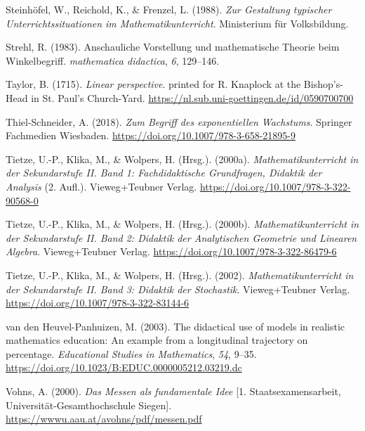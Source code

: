 \documentclass[
]{scrbook}
\newlength{\cslhangindent}
\newenvironment{CSLReferences}[2] %
 {\begin{list}{}{%
  \setlength{\itemindent}{0pt}
  \setlength{\leftmargin}{0pt}
  \setlength{\parsep}{0pt}
  \ifodd #1
   \setlength{\leftmargin}{\cslhangindent}
   \setlength{\itemindent}{-1\cslhangindent}
  \fi
  \setlength{\itemsep}{#2\baselineskip}}}
 {\end{list}}
\theoremstyle{definition}
\theoremstyle{definition}
\theoremstyle{definition}
\theoremstyle{definition}
\theoremstyle{remark}
\begin{document}
\begin{CSLReferences}{1}{0}
Steinhöfel, W., Reichold, K., \& Frenzel, L. (1988). \emph{Zur {Gestaltung} typischer {Unterrichtssituationen} im {Mathematikunterricht}}. Ministerium für Volksbildung.

Strehl, R. (1983). Anschauliche {Vorstellung} und mathematische {Theorie} beim {Winkelbegriff}. \emph{mathematica didactica}, \emph{6}, 129--146.

Taylor, B. (1715). \emph{Linear perspective}. printed for R. Knaplock at the Bishop's-Head in St. Paul's Church-Yard. \url{https://nl.sub.uni-goettingen.de/id/0590700700}

Thiel-Schneider, A. (2018). \emph{Zum {Begriff} des exponentiellen {Wachstums}}. Springer Fachmedien Wiesbaden. \url{https://doi.org/10.1007/978-3-658-21895-9}

Tietze, U.-P., Klika, M., \& Wolpers, H. (Hrsg.). (2000a). \emph{Mathematikunterricht in der {Sekundarstufe} {II}. {Band} 1: {Fachdidaktische} {Grundfragen}, {Didaktik} der {Analysis}} (2. Aufl.). Vieweg+Teubner Verlag. \url{https://doi.org/10.1007/978-3-322-90568-0}

Tietze, U.-P., Klika, M., \& Wolpers, H. (Hrsg.). (2000b). \emph{Mathematikunterricht in der {Sekundarstufe} {II}. {Band} 2: {Didaktik} der {Analytischen} {Geometrie} und {Linearen} {Algebra}}. Vieweg+Teubner Verlag. \url{https://doi.org/10.1007/978-3-322-86479-6}

Tietze, U.-P., Klika, M., \& Wolpers, H. (Hrsg.). (2002). \emph{Mathematikunterricht in der {Sekundarstufe} {II}. {Band} 3: {Didaktik} der {Stochastik}}. Vieweg+Teubner Verlag. \url{https://doi.org/10.1007/978-3-322-83144-6}

van den Heuvel-Panhuizen, M. (2003). The didactical use of models in realistic mathematics education: {An} example from a longitudinal trajectory on percentage. \emph{Educational Studies in Mathematics}, \emph{54}, 9--35. \url{https://doi.org/10.1023/B:EDUC.0000005212.03219.dc}

Vohns, A. (2000). \emph{Das {Messen} als fundamentale {Idee}} {[}1. Staatsexamensarbeit, Universität-Gesamthochschule Siegen{]}. \url{https://wwwu.aau.at/avohns/pdf/messen.pdf}


\end{CSLReferences}
\end{document}
